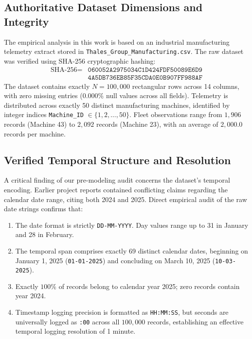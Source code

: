 \documentclass[journal]{IEEEtran}
\begin{document}
\subsection{Authoritative Dataset Dimensions and Integrity}
The empirical analysis in this work is based on an industrial manufacturing telemetry extract stored in \texttt{Thales\_Group\_Manufacturing.csv}. The raw dataset was verified using SHA-256 cryptographic hashing:
\begin{equation}
\begin{aligned}
\text{SHA-256} = {} & \mathtt{060052A2975034C1D424FDF50089E6D9} \\
                    & \mathtt{4A5DB736EB85F35CDA0E0B907FF988AF}
\end{aligned}
\end{equation}
The dataset contains exactly $N = 100{,}000$ rectangular rows across 14 columns, with zero missing entries ($0.000\%$ null values across all fields). Telemetry is distributed across exactly 50 distinct manufacturing machines, identified by integer indices \texttt{Machine\_ID} $\in \{1, 2, \dots, 50\}$. Fleet observations range from $1{,}906$ records (Machine 43) to $2{,}092$ records (Machine 23), with an average of $2{,}000.0$ records per machine.

\subsection{Verified Temporal Structure and Resolution}
A critical finding of our pre-modeling audit concerns the dataset's temporal encoding. Earlier project reports contained conflicting claims regarding the calendar date range, citing both 2024 and 2025. Direct empirical audit of the raw date strings confirms that:
\begin{enumerate}
    \item The date format is strictly \texttt{DD-MM-YYYY}. Day values range up to 31 in January and 28 in February.
    \item The temporal span comprises exactly 69 distinct calendar dates, beginning on January 1, 2025 (\texttt{01-01-2025}) and concluding on March 10, 2025 (\texttt{10-03-2025}).
    \item Exactly $100\%$ of records belong to calendar year 2025; zero records contain year 2024.
    \item Timestamp logging precision is formatted as \texttt{HH:MM:SS}, but seconds are universally logged as \texttt{:00} across all $100{,}000$ records, establishing an effective temporal logging resolution of 1 minute.
\end{enumerate}
\end{document}

